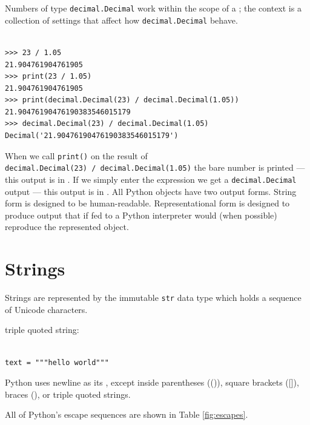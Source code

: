 Numbers of type \verb|decimal.Decimal| work within the scope of a ; the context is a collection of settings that affect how \verb|decimal.Decimal| behave.


\begin{lstlisting}

>>> 23 / 1.05
21.904761904761905
>>> print(23 / 1.05)
21.904761904761905
>>> print(decimal.Decimal(23) / decimal.Decimal(1.05))
21.90476190476190383546015179
>>> decimal.Decimal(23) / decimal.Decimal(1.05)
Decimal('21.90476190476190383546015179')
\end{lstlisting}


When we call \verb|print()| on the result of \\
\verb|decimal.Decimal(23) / decimal.Decimal(1.05)| the bare number is printed --- this output is in .
If we simply enter the expression we get a \verb|decimal.Decimal| output --- this output is in .
All Python objects have two output forms. String form is designed to be human-readable. Representational form is designed to produce output that if fed to a Python interpreter would (when possible) reproduce the represented object.



\section{Strings}

Strings are represented by the immutable \verb|str| data type which holds a sequence of Unicode characters.

triple quoted string: 
\begin{lstlisting}

text = """hello world"""
\end{lstlisting}


\begin{tcolorbox}
Python uses newline as its , except inside parentheses (()), square brackets ([]), braces ({}), or triple quoted strings.  
\end{tcolorbox}


All of Python's escape sequences are shown in Table \ref{fig:escapes}.

